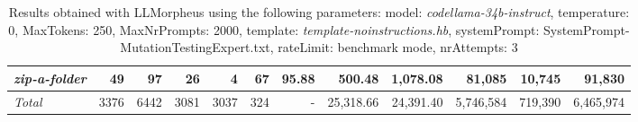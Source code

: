 \begin{table*}
{\begin{tabular}{l||r|r|r|r|r|r||r|r||r|r|r}
   \hline
   \textit{zip-a-folder} & 49 & 97 & 26 & 4 & 67 & 95.88 & 500.48 & 1,078.08 & 81,085 & 10,745 & 91,830 \\ 
   \hline
   \textit{Total} & 3376 & 6442 & 3081 & 3037 & 324 & - & 25,318.66  & 24,391.40 & 5,746,584 & 719,390 & 6,465,974 \\ 
 \end{tabular}
 }
 \caption{Results obtained with LLMorpheus using the following parameters: 
   model: \textit{codellama-34b-instruct}, 
   temperature: 0, 
   MaxTokens: 250, 
   MaxNrPrompts: 2000, 
   template: \textit{template-noinstructions.hb}, 
   systemPrompt: SystemPrompt-MutationTestingExpert.txt, 
   rateLimit: benchmark mode, 
   nrAttempts: 3  
 }
\end{table*}

